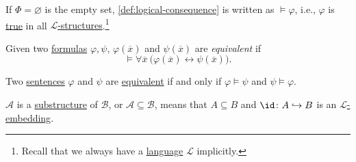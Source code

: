 If \(\Phi = \varnothing \) is the empty set, \autoref{def:logical-consequence} is written as \(\models \varphi \), i.e., \(\varphi \) is \hyperref[def:truth]{true} in all \hyperref[def:structure]{\(\mathcal{L} \)-structures}.\footnote{Recall that we always have a \hyperref[def:language]{language} \(\mathcal{L} \) implicitly.}

\begin{definition}[Equivalent]\label{def:equivalent}
	Given two \hyperref[def:formula]{formulas} \(\varphi , \psi \), \(\varphi (\overline{x} )\) and \(\psi (\overline{x} )\) are \emph{equivalent} if
	\[
		\models \forall \overline{x} \ \big(\varphi (\overline{x} ) \leftrightarrow \psi (\overline{x} )\big).
	\]
\end{definition}

\begin{problem*}
	Two \hyperref[def:sentence]{sentences} \(\varphi \) and \(\psi \) are \hyperref[def:equivalent]{equivalent} if and only if \(\varphi \models \psi \) and \(\psi \models \varphi \).
\end{problem*}

\begin{prev}
	\(\mathcal{A} \) is a \hyperref[def:substructure]{substructure} of \(\mathcal{B} \), or \(\mathcal{A} \subseteq \mathcal{B} \), means that \(A \subseteq B\) and \(\id\colon A \hookrightarrow B \) is an \hyperref[def:embedding]{\(\mathcal{L} \)-embedding}.
\end{prev}

